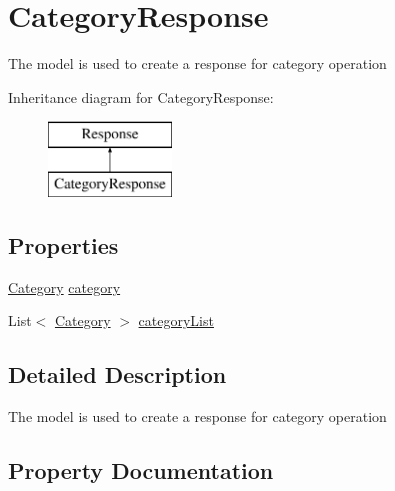 \hypertarget{classWildLifeTracker_1_1Response_1_1CategoryResponse}{}\section{Category\+Response}
\label{classWildLifeTracker_1_1Response_1_1CategoryResponse}


The model is used to create a response for category operation  


Inheritance diagram for Category\+Response\+:\begin{figure}[H]
\begin{center}
\leavevmode
\includegraphics[height=2.000000cm]{classWildLifeTracker_1_1Response_1_1CategoryResponse}
\end{center}
\end{figure}
\subsection*{Properties}
\begin{DoxyCompactItemize}
\item 
\hyperlink{classWildLifeTracker_1_1Models_1_1Category}{Category} \hyperlink{classWildLifeTracker_1_1Response_1_1CategoryResponse_a08b424ccd4f519f4a97826f9d3f3f094}{category}
\item 
List$<$ \hyperlink{classWildLifeTracker_1_1Models_1_1Category}{Category} $>$ \hyperlink{classWildLifeTracker_1_1Response_1_1CategoryResponse_ac20f04846190de6a34eadd21501afae3}{category\+List}
\end{DoxyCompactItemize}


\subsection{Detailed Description}
The model is used to create a response for category operation 



\subsection{Property Documentation}
\mbox{\label{classWildLifeTracker_1_1Response_1_1CategoryResponse_a08b424ccd4f519f4a97826f9d3f3f094}} 

